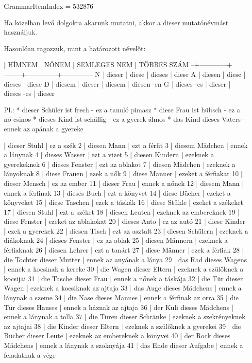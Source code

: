 \documentclass{article}
\newenvironment{desc}{\verbatim}{\endverbatim}
\newenvironment{exmp}{\verbatim}{\endverbatim}
\begin{document}
GrammarItemIndex = 532876

\begin{desc}
Ha közelban levő dolgokra akarunk mutatni, akkor a dieser mutatónévmást használjuk.

Hasonlóan ragozzuk, mint a határozott névelőt:

  | HÍMNEM     | NŐNEM  | SEMLEGES NEM | TÖBBES SZÁM
--+------------+--------+--------------+--------------
N | dieser     | diese  | dieses       | diese
A | diesen     | diese  | dieses       | diese
D | diesem     | dieser | diesem       | diesen -en
G | dieses -es | dieser | dieses -es   | dieser

Pl.: * dieser Schüler ist frech - ez a tanuló pimasz
* diese Frau ist hübsch - ez a nő csinos
* dieses Kind ist schäflig - ez a gyerek álmos
* das Kind dieses Vaters - ennek az apának a gyereke
\end{desc}

\begin{exmp}
1 | dieser Stuhl | ez a szék
2 | diesen Mann | ezt a férfit
3 | diesem Mädchen | ennek a lánynak
4 | dieses Wasser | ezt a vizet
5 | diesen Kindern | ezeknek a gyerekeknek
6 | dieses Fenster | ezt az ablakot
7 | diesen Mädchen | ezeknek a lányoknak
8 | diese Frauen | ezek a nők
9 | diese Männer | ezeket a férfiakat
10 | dieser Mensch | ez az ember
11 | dieser Frau | ennek a nőnek
12 | diesem Mann | ennek a férfinak
13 | dieses Buch | ezt a könyvet
14 | diese Bücher | ezeket a könyveket
15 | diese Taschen | ezek a táskák
16 | diese Stühle | ezeket a székeket
17 | diesen Stuhl | ezt a széket
18 | diesen Leuten | ezeknek az embereknek
19 | diese Fenster | ezeket az ablakokat
20 | dieses Auto | ez az autó
21 | diese Kinder | ezek a gyerekek
22 | diesen Tisch | ezt az asztalt
23 | diesen Schülern | ezeknek a diákoknak
24 | dieses Fenster | ez az ablak
25 | diesen Männern | ezeknek a férfiaknak
26 | diesen Lehrer | ezt a tanárt
27 | diese Männer | ezek a férfiak
28 | die Tochter dieser Mutter | ennek az anyának a lánya
29 | das Rad dieses Wagens | ennek a kocsinak a kereke
30 | die Wagen dieser Eltern | ezeknek a szülőknek a kocsijai
31 | die Tasche dieser Frau | ennek a nőnek a táskája
32 | die Tür dieser Wagen | ezeknek a kocsiknak az ajtaja
33 | das Auge dieses Mädchens | ennek a lánynak a szeme
34 | die Nase dieses Mannes | ennek a férfinak az orra
35 | die Tür dieses Hauses | ennek a háznak az ajtaja
36 | der Kuli dieses Mädchens | ennek a lánynak a tolla
37 | die Türen dieser Schränke | ezeknek a szekrényeknek az ajtajai
38 | die Kinder dieser Eltern | ezeknek a szülőknek a gyerekei
39 | die Bücher dieser Leute | ezeknek az embereknek a könyvei
40 | der Rock dieses Mädchens | ennek a lánynak a szoknyája
41 | das Ende dieser Aufgabe | ennek a feladatnak a vége
\end{exmp}
\end{document}
